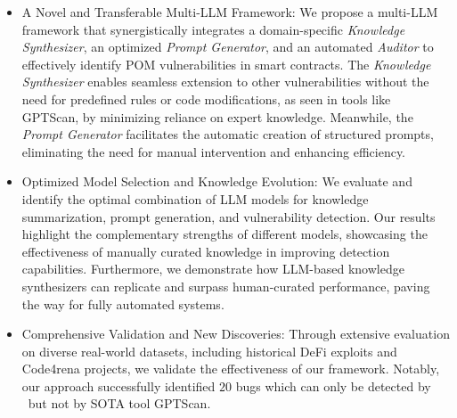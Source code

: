 \begin{itemize}


\item A Novel and Transferable Multi-LLM Framework:
We propose a multi-LLM framework that synergistically integrates a domain-specific \textit{Knowledge Synthesizer}, an optimized \textit{Prompt Generator}, and an automated \textit{Auditor} to effectively identify POM vulnerabilities in smart contracts. 
The \textit{Knowledge Synthesizer} enables seamless extension to other vulnerabilities without the need for predefined rules or code modifications, as seen in tools like GPTScan, by minimizing reliance on expert knowledge.
Meanwhile, the \textit{Prompt Generator} facilitates the automatic creation of structured prompts, eliminating the need for manual intervention and enhancing efficiency.



\item Optimized Model Selection and Knowledge Evolution:
We evaluate and identify the optimal combination of LLM models for knowledge summarization, prompt generation, and vulnerability detection. Our results highlight the complementary strengths of different models, showcasing the effectiveness of manually curated knowledge in improving detection capabilities. Furthermore, we demonstrate how LLM-based knowledge synthesizers can replicate and surpass human-curated performance, paving the way for fully automated systems.


\item Comprehensive Validation and New Discoveries:
Through extensive evaluation on diverse real-world datasets, including historical DeFi exploits and Code4rena projects, we validate the effectiveness of our framework. 
Notably, our approach successfully identified $20$ bugs which can only be detected by \tool~but not by SOTA tool GPTScan.
\end{itemize}


